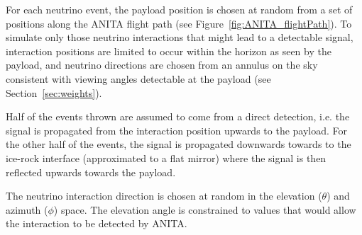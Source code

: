 For each neutrino event, the payload position is chosen at random from a set of positions along the ANITA flight path (see Figure~\ref{fig:ANITA_flightPath}).
To simulate only those neutrino interactions that might lead to a detectable signal, interaction positions are limited to occur within the horizon as seen by the payload, and neutrino directions are chosen from an annulus on the sky consistent with viewing angles detectable at the payload (see Section~\ref{sec:weights}).


Half of the events thrown are assumed to come from a direct detection,
i.e. the signal is propagated from the interaction position upwards to
the payload.
For the other half of the events, the signal is propagated downwards
towards to the ice-rock interface (approximated to a flat mirror)
where the signal is then reflected upwards towards the payload. 

The neutrino interaction direction is chosen at random in the
elevation ($\theta$) and azimuth ($\phi$) space.
The elevation angle is constrained to values that would allow the interaction to be detected by ANITA. 



